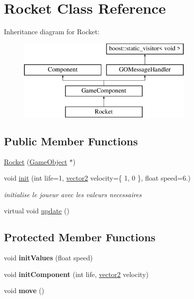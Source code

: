 \hypertarget{class_rocket}{}\section{Rocket Class Reference}
\label{class_rocket}
Inheritance diagram for Rocket\+:\begin{figure}[H]
\begin{center}
\leavevmode
\includegraphics[height=4.000000cm]{class_rocket}
\end{center}
\end{figure}
\subsection*{Public Member Functions}
\begin{DoxyCompactItemize}
\item 
\hyperlink{class_rocket_aa1ab185c1ec59b4983114b41efd59ea0}{Rocket} (\hyperlink{class_game_object}{Game\+Object} $\ast$)
\item 
void \hyperlink{class_rocket_ace1889a9c70f40bafb955dbc48ecc9d0}{init} (int life=1, \hyperlink{structvector2}{vector2} velocity=\{ 1, 0 \}, float speed=6.)
\begin{DoxyCompactList}\small\item\em initialise le joueur avec les valeurs necessaires \end{DoxyCompactList}\item 
virtual void \hyperlink{class_rocket_aa0f4dcf673358e841e4b4b2fa0b1462e}{update} ()
\end{DoxyCompactItemize}
\subsection*{Protected Member Functions}
\begin{DoxyCompactItemize}
\item 
\hypertarget{class_rocket_aa73e743c57e1be5dd4c23c3dc5bc498f}{}\label{class_rocket_aa73e743c57e1be5dd4c23c3dc5bc498f} 
void {\bfseries init\+Values} (float speed)
\item 
\hypertarget{class_rocket_a3f444dd351e952656067724b1fc7b1ee}{}\label{class_rocket_a3f444dd351e952656067724b1fc7b1ee} 
void {\bfseries init\+Component} (int life, \hyperlink{structvector2}{vector2} velocity)
\item 
\hypertarget{class_rocket_aa9131c195e7b644b036f745df9b00e94}{}\label{class_rocket_aa9131c195e7b644b036f745df9b00e94} 
void {\bfseries move} ()
\end{DoxyCompactItemize}
